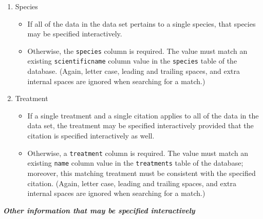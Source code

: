 \begin{enumerate}
\item Species

\begin{itemize}
\item If all of the data in the data set pertains to a single species, that
  species may be specified interactively.
\item Otherwise, the \verb|species| column is required.  The value must match an
  existing \verb|scientificname| column value in the \verb|species| table of the
  database.  (Again, letter case, leading and trailing spaces, and extra
  internal spaces are ignored when searching for a match.)
\end{itemize}

\item Treatment

\begin{itemize}
\item If a single treatment and a single citation applies to all of the data in
  the data set, the treatment may be specified interactively provided that
  the citation is specified interactively as well.
\item Otherwise, a \verb|treatment| column is required.  The value must match an
  existing \verb|name| column value in the \verb|treatments| table of the database; moreover, this matching treatment must be consistent with the specified citation.
  (Again, letter case, leading and trailing spaces, and extra internal
  spaces are ignored when searching for a match.)
\end{itemize}

\end{enumerate}

\textbf{\textit{Other information that may be specified interactively}}
    

